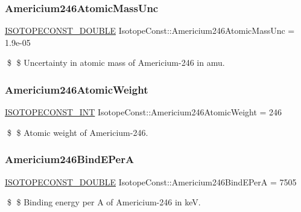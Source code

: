 \subsubsection{\texorpdfstring{Americium246\+Atomic\+Mass\+Unc}{Americium246AtomicMassUnc}}
{\footnotesize\ttfamily \mbox{\hyperlink{group___isotope_const-_macros_ga8f45a7272ce02c0b4c65c44636ed719a}{I\+S\+O\+T\+O\+P\+E\+C\+O\+N\+S\+T\+\_\+\+D\+O\+U\+B\+LE}} Isotope\+Const\+::\+Americium246\+Atomic\+Mass\+Unc = 1.\+9e-\/05}

\$ \$ Uncertainty in atomic mass of Americium-\/246 in amu. \mbox{\label{group___isotope_const-_americium-_am246_ga77fe20dd7e17cb9e8afa1da48ba6e5e3}} 
\subsubsection{\texorpdfstring{Americium246\+Atomic\+Weight}{Americium246AtomicWeight}}
{\footnotesize\ttfamily \mbox{\hyperlink{group___isotope_const-_macros_ga5f18360b3e99483a35c32d789e62621c}{I\+S\+O\+T\+O\+P\+E\+C\+O\+N\+S\+T\+\_\+\+I\+NT}} Isotope\+Const\+::\+Americium246\+Atomic\+Weight = 246}

\$ \$ Atomic weight of Americium-\/246. \mbox{\label{group___isotope_const-_americium-_am246_ga0de7fb3d796d481ec2a8b816e837699a}} 
\subsubsection{\texorpdfstring{Americium246\+Bind\+E\+PerA}{Americium246BindEPerA}}
{\footnotesize\ttfamily \mbox{\hyperlink{group___isotope_const-_macros_ga8f45a7272ce02c0b4c65c44636ed719a}{I\+S\+O\+T\+O\+P\+E\+C\+O\+N\+S\+T\+\_\+\+D\+O\+U\+B\+LE}} Isotope\+Const\+::\+Americium246\+Bind\+E\+PerA = 7505}

\$ \$ Binding energy per A of Americium-\/246 in keV. \mbox{\label{group___isotope_const-_americium-_am246_ga98caa266460f0a3e3f926f2dc47edd60}} 
